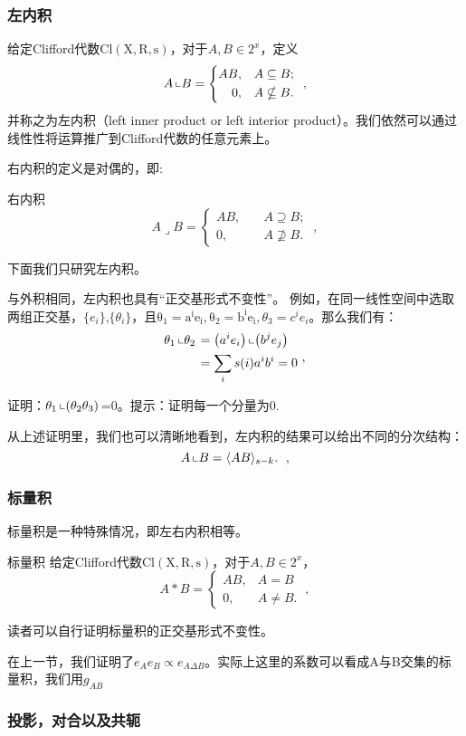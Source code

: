 \subsubsection{左内积}
\begin{definition}{}
给定Clifford代数$\mathrm {Cl(X,R,s)}$，对于$A,B\in 2^x$，定义
\begin{equation}
A\left\llcorner B=\left\{\begin{aligned}
A B,\quad & A \subseteq B ; \\
0,\quad & A \nsubseteq B .
\end{aligned}\right.\right.~,
\end{equation}
并称之为左内积（left inner product or left interior product）。我们依然可以通过线性性将运算推广到Clifford代数的任意元素上。
\end{definition}
右内积的定义是对偶的，即:
\begin{definition}{右内积}
\begin{equation}
A\lrcorner B=\left\{\begin{aligned}
A B,\quad & A \supseteq B ; \\
0,\quad & A \nsupseteq B .
\end{aligned}\right.~,
\end{equation}
\end{definition}
下面我们只研究左内积。

与外积相同，左内积也具有“正交基形式不变性”。
例如，在同一线性空间中选取两组正交基，$\{e_i\}$,$\{\theta _i\}$，且$\mathrm {\theta_1=a^ie_i,\theta_2=b^ie_i},\theta_3=c^ie_i$。那么我们有：
\begin{equation}
\begin{aligned}
\theta_1\left\llcorner\theta_2\right. & =\left(a^i e_i\right)\left\llcorner\left(b^j e_j\right)\right. \\
& =\sum_i s(i) a^i b^i=0
\end{aligned}~,
\end{equation}
\begin{exercise}{}
证明：$\theta_1\left\llcorner(\theta_2\theta_3)\right.$=0。提示：证明每一个分量为0.
\end{exercise}
从上述证明里，我们也可以清晰地看到，左内积的结果可以给出不同的分次结构：
\begin{equation}
A\left\llcorner B=\langle A B\rangle_{s-k} .\right.~,
\end{equation}

\subsubsection{标量积}
标量积是一种特殊情况，即左右内积相等。
\begin{definition}{标量积}
给定Clifford代数$\mathrm {Cl(X,R,s)}$，对于$A,B\in 2^x$，
\begin{equation}
A * B=\left\{\begin{array}{cc}
A B, & A=B \\
0, & A \neq B .
\end{array}\right.~,
\end{equation}
\end{definition}
读者可以自行证明标量积的正交基形式不变性。

在上一节，我们证明了$e_Ae_B\propto e_{A\Delta B}$。实际上这里的系数可以看成A与B交集的标量积，我们用$g_{AB}$

\subsubsection{投影，对合以及共轭}